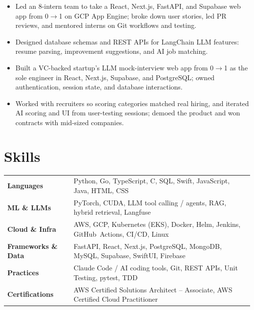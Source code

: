 \documentclass[11pt, letterpaper]{article}
\begin{document}
\vspace{1pt}
\begin{itemize}
  \item Led an 8-intern team to take a React, Next.js, FastAPI, and Supabase web app from 0$\to$1 on GCP App Engine; broke down user stories, led PR reviews, and mentored interns on Git workflows and testing.
  \item Designed database schemas and REST APIs for LangChain LLM features: resume parsing, improvement suggestions, and AI job matching.
\end{itemize}

\vspace{1pt}
\begin{itemize}
  \item Built a VC-backed startup's LLM mock-interview web app from 0$\to$1 as the sole engineer in React, Next.js, Supabase, and PostgreSQL; owned authentication, session state, and database interactions.
  \item Worked with recruiters so scoring categories matched real hiring, and iterated AI scoring and UI from user-testing sessions; demoed the product and won contracts with mid-sized companies.
\end{itemize}

\section{Skills}
\begin{tabularx}{\textwidth}{@{}l @{\hspace{7pt}} >{\raggedright\arraybackslash}X@{}}
  \textbf{Languages} & Python, Go, TypeScript, C, SQL, Swift, JavaScript, Java, HTML, CSS \\[1pt]
  \textbf{ML \& LLMs} & PyTorch, CUDA, LLM tool calling / agents, RAG, hybrid retrieval, Langfuse \\[1pt]
  \textbf{Cloud \& Infra} & AWS, GCP, Kubernetes (EKS), Docker, Helm, Jenkins, GitHub~Actions, CI/CD, Linux \\[1pt]
  \textbf{Frameworks \& Data} & FastAPI, React, Next.js, PostgreSQL, MongoDB, MySQL, Supabase, SwiftUI, Firebase \\[1pt]
  \textbf{Practices} & Claude Code / AI coding tools, Git, REST APIs, Unit Testing, pytest, TDD \\[1pt]
  \textbf{Certifications} & AWS Certified Solutions Architect -- Associate, AWS Certified Cloud Practitioner \\
\end{tabularx}
\end{document}

